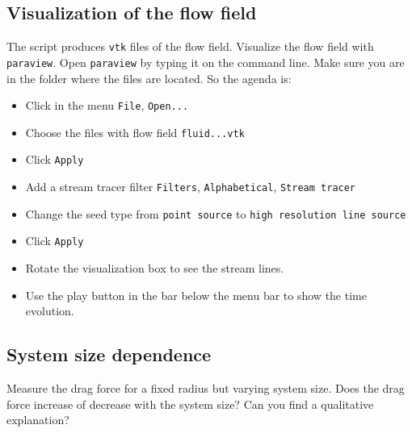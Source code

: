\subsection*{Visualization of the flow field}
The script produces \texttt{vtk} files of the flow field. Visualize the flow field
with \texttt{paraview}. Open \texttt{paraview} by typing it on the command line. Make
sure you are in the folder where the files are located. So the agenda is:
\begin{itemize}
	\item Click in the menu \texttt{File}, \texttt{Open...}
	\item Choose the files with flow field \texttt{fluid...vtk}
	\item Click \texttt{Apply}
	\item Add a stream tracer filter \texttt{Filters}, \texttt{Alphabetical},
	        \texttt{Stream tracer}
	\item Change the seed type from \texttt{point source} to \texttt{high resolution
		line source}
	\item Click \texttt{Apply}
	\item Rotate the visualization box to see the stream lines.
	\item Use the play button in the bar below the menu bar to show the time
		evolution.
\end{itemize}

\subsection*{System size dependence}
Measure the drag force for a fixed radius but varying system size. Does the drag
force increase of decrease with the system size? Can you find a qualitative
explanation?
